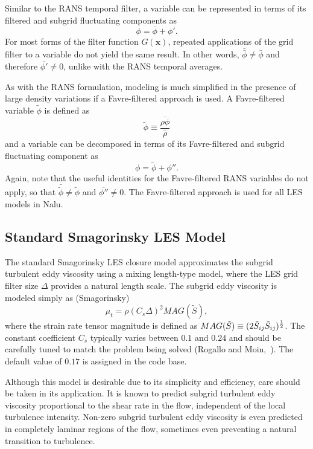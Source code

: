 Similar to the RANS temporal filter, a variable can be represented in 
terms of its filtered and subgrid fluctuating components as
%
\begin{equation}
\phi = \bar{\phi} + \phi'.
\end{equation}
%
For most forms of the filter function $G(\boldsymbol{x})$,
repeated applications of the grid filter to a variable do not yield the
same result.  In other words, $\bar{\bar{\phi}} \ne 
\bar{\phi}$ and therefore $\overline{\phi'} \ne 0$, unlike with the 
RANS temporal averages.

As with the RANS formulation, modeling is much simplified in the
presence of large density variations if a Favre-filtered approach is used.
A Favre-filtered variable $\tilde{\phi}$ is defined as
%
\begin{equation}
\tilde{\phi} \equiv \frac{ \overline{\rho\phi} }{ \bar{\rho} }
\end{equation}
%
and a variable can be decomposed in terms of its Favre-filtered and
subgrid fluctuating component as
%
\begin{equation}
\phi = \tilde{\phi} + \phi''.
\end{equation}
%
Again, note that the useful identities for the Favre-filtered RANS
variables do not apply, so that $\bar{\tilde{\phi}} \ne \tilde{\phi}$
and $\overline{\phi''} \ne 0$.  The Favre-filtered approach is used for
all LES models in Nalu.

\subsection{Standard Smagorinsky LES Model}

The standard Smagorinsky LES closure model approximates the subgrid
turbulent eddy viscosity using a mixing length-type model, where the 
LES grid filter size $\Delta$ provides a natural length scale.  The
subgrid eddy viscosity is modeled simply as (Smagorinsky)
%
\begin{equation}
\mu_t = \rho \left(C_s \Delta \right)^2 MAG(\tilde {S}),
\label{mut-smag}
\end{equation}
%
where the strain rate tensor magnitude is defined as 
$MAG(\tilde{S}) \equiv (2 \tilde{S}_{ij} \tilde{S}_{ij})^{{1} \over {2}}$.
The constant coefficient $C_s$ typically varies between $0.1$ and
$0.24$ and should be carefully tuned to match the problem being solved
(Rogallo and Moin,~\cite{Rogallo:1984}).  The default value of $0.17$ is assigned in the code base.

Although this model is desirable due to its simplicity and efficiency,
care should be taken in its application.  It is known to predict subgrid
turbulent eddy viscosity proportional to the shear rate in the flow,
independent of the local turbulence intensity.  Non-zero subgrid turbulent
eddy viscosity is even predicted in completely laminar regions of the
flow, sometimes even preventing a natural transition to turbulence.

